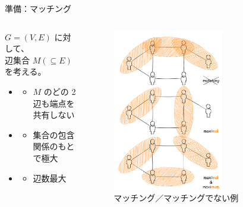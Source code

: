 \documentclass[aspectratio=169]{beamer}
\begin{document}
\begin{frame}{準備：マッチング}
	\begin{columns}
		\begin{column}{0.5\textwidth}
			\(G = (V, E)\) に対して、\\
			\alert{辺集合} \(M (\subseteq E)\) を考える。
			\begin{itemize}
				\item {}
				      \begin{itemize}
					      \item \(M\) のどの 2 辺も端点を共有しない
				      \end{itemize}
				\item {}
				      \begin{itemize}
					      \item 集合の包含関係のもとで極大
				      \end{itemize}
				\item {}
				      \begin{itemize}
					      \item 辺数最大
				      \end{itemize}
			\end{itemize}
		\end{column}
		\begin{column}{0.5\textwidth}
			\begin{figure}
				\centering
				\includegraphics[width=0.65\textwidth]{figures/matching.png}
				\caption{マッチング／マッチングでない例}
			\end{figure}
		\end{column}
	\end{columns}

\end{frame}
\end{document}
